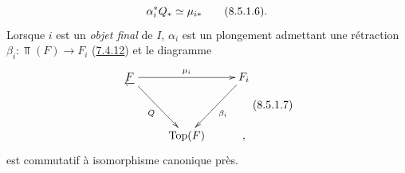 \documentclass[10pt]{../fichiers-configuration-latex/smfart}
\begin{document}
\begin{equation*}
\alpha^{\ast}_i Q_{\ast} \simeq \mu_{i\ast}\tag{8.5.1.6}{}.
\end{equation*}
Lorsque $i$ est un \emph{objet final} de $I$, $\alpha_i$ est un
plongement admettant une rétraction $\beta_i : \Top(F) \to F_i$
(\hyperref[VI.lem7.4.12]{7.4.12}) et le diagramme
\[\vcenter{
\xymatrix@R=1.25cm{
{\underleftarrow{F}}  \ar[rr]^{\mu_i}\ar[rd]_{Q}&                 &F_i\ar[ld]^{\beta_i}\\
                                   &  \SGAVIEightFiveOneSevenTarget      &       ,
}}\leqno{(8.5.1.7)}
\]
est commutatif à isomorphisme canonique près.
\end{document}
